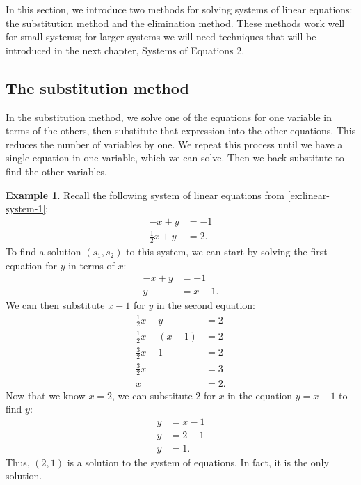 \documentclass{article}
\theoremstyle{definition}
\newtheorem{example}{Example}
\begin{document}
In this section, we introduce two methods for solving systems of linear equations: the substitution method and the elimination method. These methods work well for small systems; for larger systems we will need techniques that will be introduced in the next chapter, Systems of Equations 2.

\subsection*{The substitution method}\label{subsec:substitution-method}

In the substitution method, we solve one of the equations for one variable in terms of the others, then substitute that expression into the other equations. This reduces the number of variables by one. We repeat this process until we have a single equation in one variable, which we can solve. Then we back-substitute to find the other variables.

\begin{example}\label{ex:substitution-method-1}
Recall the following system of linear equations from \cref{ex:linear-system-1}:
\begin{align*}
    -x+y&=-1 \\
    \frac{1}{2}x+y&=2.
\end{align*}
To find a solution \((s_1, s_2)\) to this system, we can start by solving the first equation for \(y\) in terms of \(x\):
\begin{align*}
    -x+y&=-1 \\
    y&=x-1.
\end{align*}
We can then substitute \(x-1\) for \(y\) in the second equation:
\begin{align*}
    \frac{1}{2}x+y&=2 \\
    \frac{1}{2}x+(x-1)&=2 \\
    \frac{3}{2}x-1&=2 \\
    \frac{3}{2}x&=3 \\
    x&=2.
\end{align*}
Now that we know \(x=2\), we can substitute \(2\) for \(x\) in the equation \(y=x-1\) to find \(y\):
\begin{align*}
    y&=x-1 \\
    y&=2-1 \\
    y&=1.
\end{align*}
Thus, \((2, 1)\) is a solution to the system of equations. In fact, it is the only solution.
\end{example}
\end{document}
